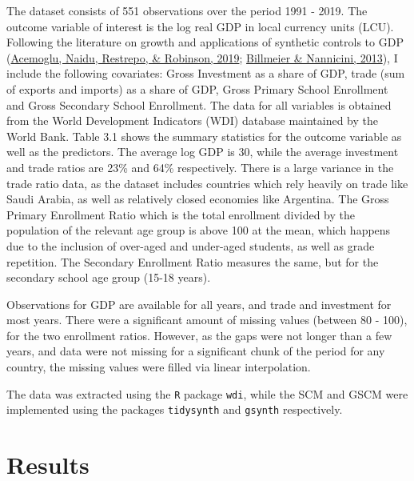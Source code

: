 \documentclass[12pt,nobind, a4paper]{reedthesis}
\begin{document}
 The dataset consists of 551 observations over the period 1991 - 2019. The outcome variable of interest is the log real GDP in local currency units (LCU). Following the literature on growth and applications of synthetic controls to GDP (\protect\hyperlink{ref-acemoglu_democracy_2019}{Acemoglu, Naidu, Restrepo, \& Robinson, 2019}; \protect\hyperlink{ref-billmeier_assessing_2013}{Billmeier \& Nannicini, 2013}), I include the following covariates: Gross Investment as a share of GDP, trade (sum of exports and imports) as a share of GDP, Gross Primary School Enrollment and Gross Secondary School Enrollment. The data for all variables is obtained from the World Development Indicators (WDI) database maintained by the World Bank. Table 3.1 shows the summary statistics for the outcome variable as well as the predictors. The average log GDP is 30, while the average investment and trade ratios are 23\% and 64\% respectively. There is a large variance in the trade ratio data, as the dataset includes countries which rely heavily on trade like Saudi Arabia, as well as relatively closed economies like Argentina. The Gross Primary Enrollment Ratio which is the total enrollment divided by the population of the relevant age group is above 100 at the mean, which happens due to the inclusion of over-aged and under-aged students, as well as grade repetition. The Secondary Enrollment Ratio measures the same, but for the secondary school age group (15-18 years).
 \linebreak

 Observations for GDP are available for all years, and trade and investment for most years. There were a significant amount of missing values (between 80 - 100), for the two enrollment ratios. However, as the gaps were not longer than a few years, and data were not missing for a significant chunk of the period for any country, the missing values were filled via linear interpolation.
 \linebreak

 The data was extracted using the \texttt{R} package \texttt{wdi}, while the SCM and GSCM were implemented using the packages \texttt{tidysynth} and \texttt{gsynth} respectively.

 \hypertarget{res}{%
 \section{Results}\label{res}}
\end{document}
